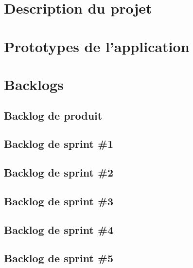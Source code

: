\documentclass{article}
\begin{document}

\tableofcontents

\newpage

\section{Description du projet}
    

\section{Prototypes de l'application}
    

\newpage

\section{Backlogs}
    \subsection{Backlog de produit}
        

\newpage

    \subsection{Backlog de sprint \#1}
        
    \subsection{Backlog de sprint \#2}
        
    \subsection{Backlog de sprint \#3}
        
    \subsection{Backlog de sprint \#4}
        
        \subsection{Backlog de sprint \#5}
        
\end{document}

